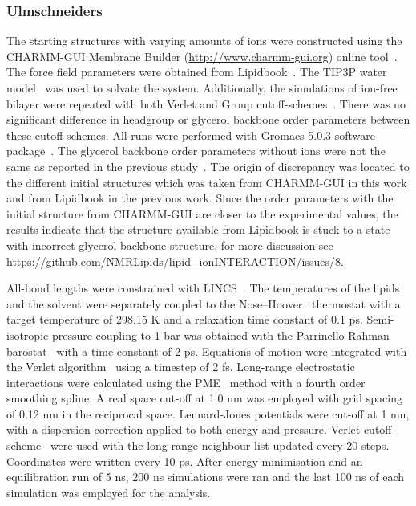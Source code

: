 \documentclass[twoside,twocolumn,9pt]{article}
\begin{document}
\subsubsection{Ulmschneiders}
The starting structures with varying amounts of ions were constructed using the CHARMM-GUI Membrane Builder (\url{http://www.charmm-gui.org}) 
online tool~\cite{lee15}. The force field parameters were obtained from Lipidbook~\cite{domanski10}. The TIP3P water model~\cite{jorgensen83} 
was used to solvate the system.  Additionally, the simulations of ion-free bilayer were repeated with both Verlet and Group cutoff-schemes~\cite{ulmschneiderPOPC0mMNaClfiles}. 
There was no significant difference in headgroup or glycerol backbone order parameters between these cutoff-schemes. All runs were performed with Gromacs 5.0.3 software package~\cite{abraham15}. 
The glycerol backbone order parameters without ions were not the same as reported in the previous study~\cite{botan15}.
The origin of discrepancy was located to the different initial structures which was taken from CHARMM-GUI in this work
and from Lipidbook in the previous work. Since the order parameters with the initial structure from CHARMM-GUI are
closer to the experimental values, the results indicate that the structure available from Lipidbook is stuck to a
state with incorrect glycerol backbone structure, for more discussion see \url{https://github.com/NMRLipids/lipid_ionINTERACTION/issues/8}.

All-bond lengths were constrained with LINCS~\cite{hess97,hess07}. The temperatures of the lipids and the solvent were separately coupled to the Nose--Hoover~\cite{nose84,hoover85} 
thermostat with a target temperature of 298.15 K and a relaxation time constant of 0.1 ps. Semi-isotropic pressure coupling to 1 bar was obtained 
with the Parrinello-Rahman barostat~\cite{parrinello81} with a time constant of 2 ps. Equations of motion were integrated with the Verlet algorithm~\cite{pall13} using a 
timestep of 2 fs. Long-range electrostatic interactions were calculated using the PME~\cite{darden93,essman95} method with a fourth order smoothing spline. 
A real space cut-off at 1.0 nm was employed with grid spacing of 0.12 nm in the reciprocal space. Lennard-Jones potentials were cut-off at 1 nm, 
with a dispersion correction applied to both energy and pressure. Verlet cutoff-scheme~\cite{pall13} were used with the long-range neighbour list updated 
every 20 steps. Coordinates were written every 10 ps. After energy minimisation and an equilibration run of 5 ns, 200 ns simulations were ran and 
the last 100 ns of each simulation was employed for the analysis.
\end{document}
